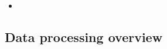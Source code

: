 \documentclass[compress, ucs, xelatex, 11pt, xcolor=x11names, aspectratio=1609,
	hyperref={
		bookmarks=true,
		unicode=true,
		colorlinks=true,
		pdftitle={HybSeq course},
		plainpages=false,
		pdfauthor={Vojtech Zeisek},
		pdfsubject={Practical processing of HybSeq target enrichment sequencing data on computing grids like MetaCentrum},
		pdfcreator={XeLaTeX},
		pdfkeywords={BASH, command line, GNU, HybSeq, Linux, MetaCentrum, sequencing shell, target enrichment},
		linkcolor=Cyan2, %
		anchorcolor=Firebrick2, %
		citecolor=Firebrick2, %
		filecolor=Firebrick2, %
		menucolor=Firebrick2, %
		urlcolor=Chartreuse2, %
		pdftex},
	url={hyphens, lowtilde} %
	]{beamer}
\begin{document}
\begin{frame}[fragile]{}
	\begin{itemize}
		\item 
	\end{itemize}
	\begin{spluscode}
    
	\end{spluscode}
	\begin{bashcode}
    
	\end{bashcode}
\end{frame}

\subsection{Data processing overview}
\end{document}
